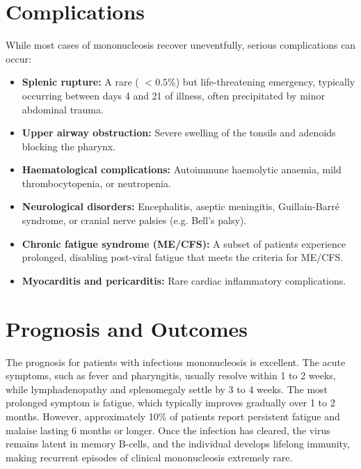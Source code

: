 \section*{Complications}
While most cases of mononucleosis recover uneventfully, serious complications can occur:
\begin{itemize}
    \item \textbf{Splenic rupture:} A rare ( $<0.5\%$) but life-threatening emergency, typically occurring between days 4 and 21 of illness, often precipitated by minor abdominal trauma.
    \item \textbf{Upper airway obstruction:} Severe swelling of the tonsils and adenoids blocking the pharynx.
    \item \textbf{Haematological complications:} Autoimmune haemolytic anaemia, mild thrombocytopenia, or neutropenia.
    \item \textbf{Neurological disorders:} Encephalitis, aseptic meningitis, Guillain-Barré syndrome, or cranial nerve palsies (e.g. Bell's palsy).
    \item \textbf{Chronic fatigue syndrome (ME/CFS):} A subset of patients experience prolonged, disabling post-viral fatigue that meets the criteria for ME/CFS.
    \item \textbf{Myocarditis and pericarditis:} Rare cardiac inflammatory complications.
\end{itemize}

\section*{Prognosis and Outcomes}
The prognosis for patients with infectious mononucleosis is excellent. The acute symptoms, such as fever and pharyngitis, usually resolve within 1 to 2 weeks, while lymphadenopathy and splenomegaly settle by 3 to 4 weeks. The most prolonged symptom is fatigue, which typically improves gradually over 1 to 2 months. However, approximately 10\% of patients report persistent fatigue and malaise lasting 6 months or longer. Once the infection has cleared, the virus remains latent in memory B-cells, and the individual develops lifelong immunity, making recurrent episodes of clinical mononucleosis extremely rare.

